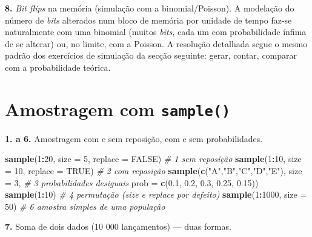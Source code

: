 \documentclass[
  portuguese,
  11pt,
  openany]{book}
\newenvironment{Shaded}{\begin{snugshade}}{\end{snugshade}}
\newcommand{\AttributeTok}[1]{\textcolor[rgb]{0.13,0.29,0.53}{#1}}
\newcommand{\CommentTok}[1]{\textcolor[rgb]{0.56,0.35,0.01}{\textit{#1}}}
\newcommand{\ConstantTok}[1]{\textcolor[rgb]{0.56,0.35,0.01}{#1}}
\newcommand{\DecValTok}[1]{\textcolor[rgb]{0.00,0.00,0.81}{#1}}
\newcommand{\FloatTok}[1]{\textcolor[rgb]{0.00,0.00,0.81}{#1}}
\newcommand{\FunctionTok}[1]{\textcolor[rgb]{0.13,0.29,0.53}{\textbf{#1}}}
\newcommand{\NormalTok}[1]{#1}
\newcommand{\SpecialCharTok}[1]{\textcolor[rgb]{0.81,0.36,0.00}{\textbf{#1}}}
\newcommand{\StringTok}[1]{\textcolor[rgb]{0.31,0.60,0.02}{#1}}
\begin{document}
\textbf{8.} \emph{Bit flips} na memória (simulação com a binomial/Poisson). A modelação do
número de \emph{bits} alterados num bloco de memória por unidade de tempo faz-se
naturalmente com uma binomial (muitos \emph{bits}, cada um com probabilidade ínfima
de se alterar) ou, no limite, com a Poisson. A resolução detalhada segue o mesmo
padrão dos exercícios de simulação da secção seguinte: gerar, contar, comparar
com a probabilidade teórica.

\section{\texorpdfstring{Amostragem com \texttt{sample()}}{Amostragem com sample()}}\label{amostragem-com-sample}

\textbf{1. a 6.} Amostragem com e sem reposição, com e sem probabilidades.

\begin{Shaded}
\begin{Highlighting}[]
\FunctionTok{sample}\NormalTok{(}\DecValTok{1}\SpecialCharTok{:}\DecValTok{20}\NormalTok{, }\AttributeTok{size =} \DecValTok{5}\NormalTok{, }\AttributeTok{replace =} \ConstantTok{FALSE}\NormalTok{)   }\CommentTok{\# 1 sem reposição}
\FunctionTok{sample}\NormalTok{(}\DecValTok{1}\SpecialCharTok{:}\DecValTok{10}\NormalTok{, }\AttributeTok{size =} \DecValTok{10}\NormalTok{, }\AttributeTok{replace =} \ConstantTok{TRUE}\NormalTok{)   }\CommentTok{\# 2 com reposição}
\FunctionTok{sample}\NormalTok{(}\FunctionTok{c}\NormalTok{(}\StringTok{"A"}\NormalTok{,}\StringTok{"B"}\NormalTok{,}\StringTok{"C"}\NormalTok{,}\StringTok{"D"}\NormalTok{,}\StringTok{"E"}\NormalTok{), }\AttributeTok{size =} \DecValTok{3}\NormalTok{,  }\CommentTok{\# 3 probabilidades desiguais}
       \AttributeTok{prob =} \FunctionTok{c}\NormalTok{(}\FloatTok{0.1}\NormalTok{, }\FloatTok{0.2}\NormalTok{, }\FloatTok{0.3}\NormalTok{, }\FloatTok{0.25}\NormalTok{, }\FloatTok{0.15}\NormalTok{))}
\FunctionTok{sample}\NormalTok{(}\DecValTok{1}\SpecialCharTok{:}\DecValTok{10}\NormalTok{)                              }\CommentTok{\# 4 permutação (size e replace por defeito)}
\FunctionTok{sample}\NormalTok{(}\DecValTok{1}\SpecialCharTok{:}\DecValTok{1000}\NormalTok{, }\AttributeTok{size =} \DecValTok{50}\NormalTok{)                 }\CommentTok{\# 6 amostra simples de uma população}
\end{Highlighting}
\end{Shaded}

\textbf{7.} Soma de dois dados (10 000 lançamentos) --- duas formas.
\end{document}
